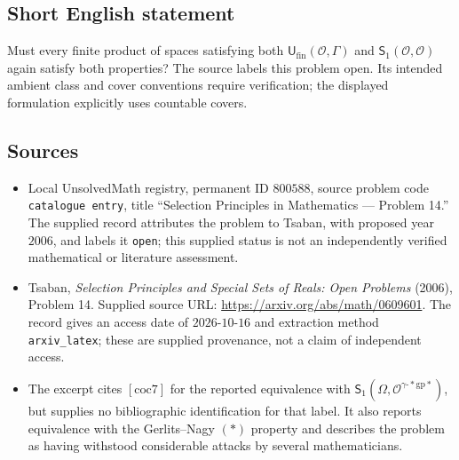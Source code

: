 \documentclass[11pt]{article}
\begin{document}
\subsection{Short English statement}
Must every finite product of spaces satisfying both \(\mathsf{U}_{\mathrm{fin}}(\mathcal{O},\Gamma)\) and \(\mathsf{S}_1(\mathcal{O},\mathcal{O})\) again satisfy both properties? The source labels this problem open. Its intended ambient class and cover conventions require verification; the displayed formulation explicitly uses countable covers.
\subsection{Sources}
\begin{itemize}
\item Local UnsolvedMath registry, permanent ID \(800588\), source problem code \texttt{catalogue entry}, title ``Selection Principles in Mathematics --- Problem 14.'' The supplied record attributes the problem to Tsaban, with proposed year \(2006\), and labels it \texttt{open}; this supplied status is not an independently verified mathematical or literature assessment.
\item Tsaban, \emph{Selection Principles and Special Sets of Reals: Open Problems} (2006), Problem 14. Supplied source URL: \url{https://arxiv.org/abs/math/0609601}. The record gives an access date of \(2026\text{-}10\text{-}16\) and extraction method \texttt{arxiv\_latex}; these are supplied provenance, not a claim of independent access.
\item The excerpt cites \([\mathrm{coc7}]\) for the reported equivalence with \(\mathsf{S}_1(\Omega,\mathcal{O}^{\gamma\text{-}*\mathrm{gp}*})\), but supplies no bibliographic identification for that label. It also reports equivalence with the Gerlits--Nagy \((*)\) property and describes the problem as having withstood considerable attacks by several mathematicians.
\end{itemize}
\end{document}

